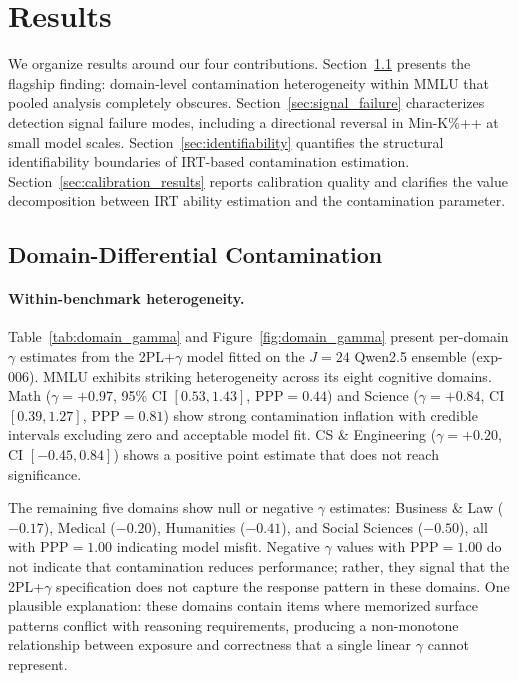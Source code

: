 \section{Results}
\label{sec:results}

We organize results around our four contributions. Section~\ref{sec:domain_differential} presents the flagship finding: domain-level contamination heterogeneity within MMLU that pooled analysis completely obscures. Section~\ref{sec:signal_failure} characterizes detection signal failure modes, including a directional reversal in Min-K\%++ at small model scales. Section~\ref{sec:identifiability} quantifies the structural identifiability boundaries of IRT-based contamination estimation. Section~\ref{sec:calibration_results} reports calibration quality and clarifies the value decomposition between IRT ability estimation and the contamination parameter.

\subsection{Domain-Differential Contamination}
\label{sec:domain_differential}

\paragraph{Within-benchmark heterogeneity.}
Table~\ref{tab:domain_gamma} and Figure~\ref{fig:domain_gamma} present per-domain $\gamma$ estimates from the 2PL+$\gamma$ model fitted on the $J=24$ Qwen2.5 ensemble (exp-006). MMLU exhibits striking heterogeneity across its eight cognitive domains. Math ($\gamma = +0.97$, 95\% CI $[0.53, 1.43]$, PPP$=0.44$) and Science ($\gamma = +0.84$, CI $[0.39, 1.27]$, PPP$=0.81$) show strong contamination inflation with credible intervals excluding zero and acceptable model fit. CS \& Engineering ($\gamma = +0.20$, CI $[-0.45, 0.84]$) shows a positive point estimate that does not reach significance.

The remaining five domains show null or negative $\gamma$ estimates: Business \& Law ($-0.17$), Medical ($-0.20$), Humanities ($-0.41$), and Social Sciences ($-0.50$), all with PPP$=1.00$ indicating model misfit. Negative $\gamma$ values with PPP$=1.00$ do not indicate that contamination reduces performance; rather, they signal that the 2PL+$\gamma$ specification does not capture the response pattern in these domains. One plausible explanation: these domains contain items where memorized surface patterns conflict with reasoning requirements, producing a non-monotone relationship between exposure and correctness that a single linear $\gamma$ cannot represent.

